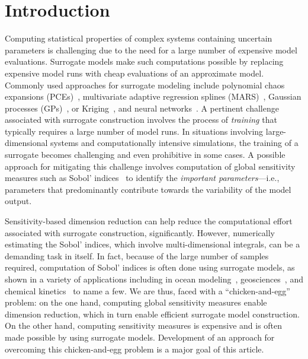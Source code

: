 \section{Introduction}
\label{sec:intro}

Computing statistical properties of 
complex systems containing uncertain parameters is
challenging due to the need for a large number of expensive model evaluations. 
Surrogate models make such computations possible by replacing 
expensive model runs with cheap evaluations of an approximate model.
%
%
Commonly used approaches for surrogate modeling include polynomial chaos
expansions (PCEs)~\cite{Xiu:2002,Ghanem:2003,Olivier:2010}, multivariate
adaptive regression splines (MARS)~\cite{friedman93}, Gaussian processes
(GPs)~\cite{Rasmussen:2004}, or Kriging~\cite{Stein:2012}, and neural
networks~\cite{Funahashi:1989,Specht:1990}. A pertinent
challenge associated with surrogate construction involves the process of
\textit{training} that typically requires a large number of model runs.  In
situations involving large-dimensional systems and computationally intensive
simulations, the training of a surrogate becomes challenging and
even prohibitive in some cases. A possible approach for mitigating this
challenge involves computation of global sensitivity measures such as Sobol'
indices~\cite{Sobol93} to identify
the \emph{important parameters}---i.e., parameters that predominantly
contribute towards the variability of the model output. 

Sensitivity-based
dimension reduction can help reduce the computational effort associated with
surrogate construction,
significantly. However, numerically estimating the Sobol' indices, which
involve multi-dimensional integrals, can be a demanding task in itself. In
fact, because of the large number of samples required, computation of Sobol'
indices is often done using surrogate models, as shown in a variety of 
applications including in ocean
modeling~\cite{AlexanderianWinokurSrajEtAl12,LiIskandaraniLeHenaffEtAl16},
geosciences~\cite{Namhata2016OladyshkinDilmoreEtAl16,deman2016,SaadAlexanderianPrudhommeEtAl17},
and chemical kinetics~\cite{DegasperiGilmore08,navarro2016global,Vohra:2014} to
name a few. 
We are thus, faced with a ``chicken-and-egg'' problem: on the one hand,
computing global sensitivity measures enable dimension reduction, which in turn
enable efficient surrogate model construction.  On the other hand, computing
sensitivity measures is expensive and is often made possible by using
surrogate models. Development of an approach for 
overcoming this chicken-and-egg problem is a major goal of this article. 


